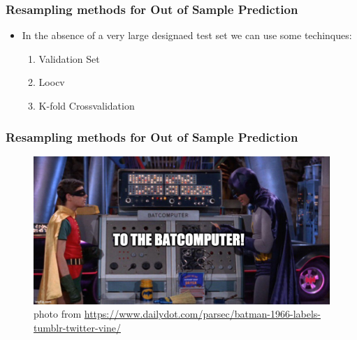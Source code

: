 \documentclass[
  shownotes,
  xcolor={svgnames},
  hyperref={colorlinks,citecolor=DarkBlue,linkcolor=andesred,urlcolor=DarkBlue}
  , aspectratio=169]{beamer}
\begin{document}
\begin{frame}
\frametitle{Resampling methods for Out of Sample Prediction}

\begin{itemize}
  \item In the absence of a very large designaed test set we can use some techinques:
  \medskip
  \begin{enumerate}
    \item Validation Set
    \medskip
    \item Loocv
    \medskip
    \item K-fold Crossvalidation
  \end{enumerate}
\end{itemize}

\end{frame}
\begin{frame}
\frametitle{Resampling methods for Out of Sample Prediction}

\begin{figure}[H] \centering
  \centering
  \includegraphics[scale=0.35]{figures/baticomputer_meme.jpg}
  \\
  \tiny photo from \url{https://www.dailydot.com/parsec/batman-1966-labels-tumblr-twitter-vine/}
\end{figure}

\end{frame}
\end{document}
